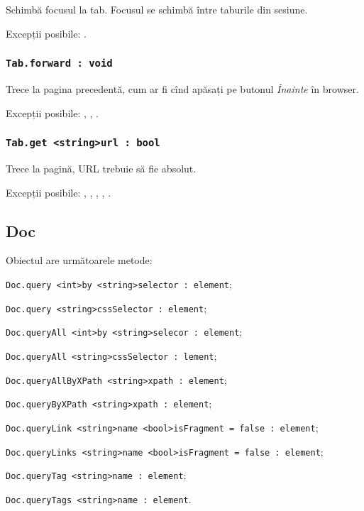 Schimbă focusul la tab. Focusul se schimbă între taburile din sesiune.

Excepții posibile: .

\subsubsection{\lstinline|Tab.forward : void|}

Trece la pagina precedentă, cum ar fi cînd apăsați pe butonul \textit{Înainte} în browser.


Excepții posibile: , , .

\subsubsection{\lstinline|Tab.get <string>url : bool|}

Trece la pagină, URL trebuie să fie absolut.

Excepții posibile: , , , , .

\subsection{{\color{orange} Doc}}

Obiectul \dom{} are următoarele metode:
\begin{icItems}
	\item \lstinline|Doc.query <int>by <string>selector : element|;
	\item \lstinline|Doc.query <string>cssSelector : element|;
	\item \lstinline|Doc.queryAll <int>by <string>selecor : element|;
	\item \lstinline|Doc.queryAll <string>cssSelector : lement|;
	\item \lstinline|Doc.queryAllByXPath <string>xpath : element|;
	\item \lstinline|Doc.queryByXPath <string>xpath : element|;
	\item \lstinline|Doc.queryLink <string>name <bool>isFragment = false : element|;
	\item \lstinline|Doc.queryLinks <string>name <bool>isFragment = false : element|;
	\item \lstinline|Doc.queryTag <string>name : element|;
	\item \lstinline|Doc.queryTags <string>name : element|.
\end{icItems}

